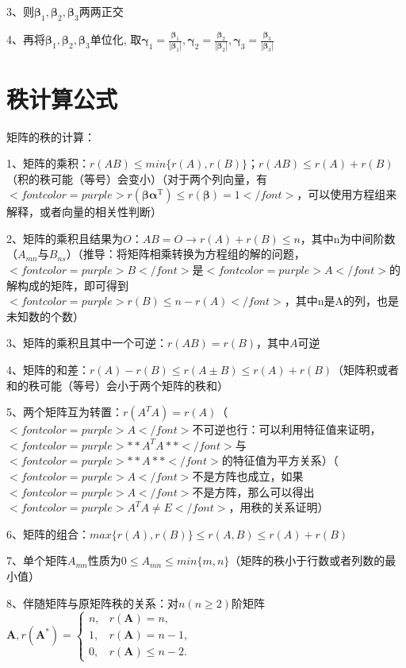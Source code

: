 3、则$ \boldsymbol{\beta}_{1}, \boldsymbol{\beta}_{2}, \boldsymbol{\beta}_{3} $两两正交

4、再将$ \boldsymbol{\beta}_{1}, \boldsymbol{\beta}_{2}, \boldsymbol{\beta}_{3} $单位化, 取$ \boldsymbol{\gamma}_{1}=\frac{\boldsymbol{\beta}_{1}}{\left|\boldsymbol{\beta}_{1}\right|}, \boldsymbol{\gamma}_{2}=\frac{\boldsymbol{\beta}_{2}}{\left|\boldsymbol{\beta}_{2}\right|}, \boldsymbol{\gamma}_{3}=\frac{\boldsymbol{\beta}_{3}}{\left|\boldsymbol{\beta}_{3}\right|} $

\section{秩计算公式}

矩阵的秩的计算：

1、矩阵的乘积：$ r(AB) \leqslant min\{r(A),r(B)\} $；$ r(AB) \leqslant r(A)+r(B) $（积的秩可能（等号）会变小）（对于两个列向量，有$ <font color=purple>r\left(\boldsymbol{\beta} \boldsymbol{\alpha}^{\mathrm{T}}\right) \leqslant r(\boldsymbol{\beta})=1</font> $，可以使用方程组来解释，或者向量的相关性判断）

2、矩阵的乘积且结果为$ O $：$ AB=O \rightarrow r(A)+r(B) \leqslant n $，其中n为中间阶数（$ A_{mn} $与$ B_{ns} $）（推导：将矩阵相乘转换为方程组的解的问题，$ <font color=purple>B</font> $是$ <font color=purple>A</font> $的解构成的矩阵，即可得到$ <font color=purple>r(B)\leqslant n - r(A) </font> $，其中n是A的列，也是未知数的个数）

3、矩阵的乘积且其中一个可逆：$ r(AB)=r(B) $，其中$ A $可逆

4、矩阵的和差：$ r(A)-r(B)\leqslant r(A\pm B) \leqslant r(A)+r(B) $（矩阵积或者和的秩可能（等号）会小于两个矩阵的秩和）

5、两个矩阵互为转置：$ r(A^TA)= r(A) $（$ <font color=purple>A</font> $不可逆也行：可以利用特征值来证明，$ <font color=purple>**A^TA**</font> $与$ <font color=purple>**A**</font> $的特征值为平方关系）（$ <font color=purple>A</font> $不是方阵也成立，如果$ <font color=purple>A</font> $不是方阵，那么可以得出$ <font color=purple>A^TA \ne E</font> $，用秩的关系证明）

6、矩阵的组合：$ max\{r(A),r(B)\}  \leqslant r(A,B) \leqslant r(A)+r(B) $

7、单个矩阵$ A_{mn} $性质为$ 0 \leqslant A_{mn} \leqslant min\{ m,n \} $（矩阵的秩小于行数或者列数的最小值）

8、伴随矩阵与原矩阵秩的关系：对$ n(n \geqslant 2) $阶矩阵$ \boldsymbol{A}, r\left(\boldsymbol{A}^{*}\right)= \begin{cases}n, & r(\boldsymbol{A})=n, \\ 1, & r(\boldsymbol{A})=n-1, \\ 0, & r(\boldsymbol{A}) \leqslant n-2 .\end{cases} $

